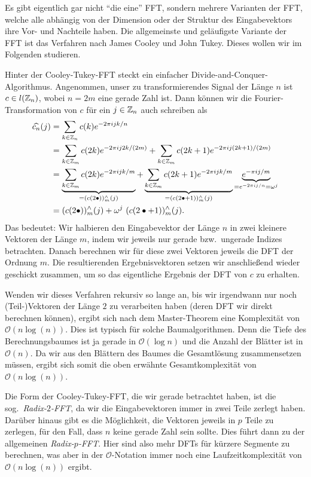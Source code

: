 Es gibt eigentlich gar nicht \enquote{die eine} FFT, sondern mehrere Varianten der FFT, welche alle 
abhängig von der Dimension oder der Struktur des Eingabevektors ihre Vor- und Nachteile haben. Die 
allgemeinste und geläufigste Variante der FFT ist das Verfahren nach James Cooley und John Tukey. 
Dieses wollen wir im Folgenden studieren.

Hinter der Cooley-Tukey-FFT steckt ein einfacher Divide-and-Conquer-Algorithmus. Angenommen, unser
zu transformierendes Signal der Länge $ n $ ist $ c \in l(\mathbb{Z}_{n}) $, wobei $ n = 2m $ eine gerade 
Zahl ist. Dann können wir die Fourier-Transformation von $ c $ für ein $ j \in \mathbb{Z}_{n} $ auch
schreiben als
\begin{align*}
    \widehat{c_{n}}(j) 
  &= \sum_{k \in \mathbb{Z}_{n}} c(k) e^{-2\pi i jk/n} \\
  &= \sum_{k \in \mathbb{Z}_{m}} c(2k) e^{-2\pi i j2k/(2m)}
       + \sum_{k \in \mathbb{Z}_{m}} c(2k+1) e^{-2\pi i j(2k+1)/(2m)} \\
  &= \underbrace{\sum_{k \in \mathbb{Z}_{m}} c(2k) e^{-2\pi i jk/m}}_{= (c(2\bullet))_{m}^{\wedge}(j)}
       + \underbrace{\sum_{k \in \mathbb{Z}_{m}} c(2k+1) e^{-2\pi i jk/m}}_{
           =(c(2\bullet + 1))_{m}^{\wedge}(j)
         }
         \underbrace{e^{-\pi i j/m}}_{= e^{-2\pi i j/n} = \omega^{j}} \\
  &= (c(2\bullet))_{m}^{\wedge}(j) + \omega^{j} \ (c(2\bullet + 1))_{m}^{\wedge}(j).
\end{align*}
Das bedeutet: Wir halbieren den Eingabevektor der Länge $ n $ in zwei kleinere Vektoren der Länge
$ m $, indem wir jeweils nur gerade bzw.\ ungerade Indizes betrachten. Danach berechnen wir für 
diese zwei Vektoren jeweils die DFT der Ordnung $ m $. Die resultierenden Ergebnisvektoren setzen 
wir anschließend wieder geschickt zusammen, um so das eigentliche Ergebnis der DFT von $ c $ zu 
erhalten.

Wenden wir dieses Verfahren rekursiv so lange an, bis wir irgendwann nur noch (Teil-)Vektoren der 
Länge $ 2 $ zu verarbeiten haben (deren DFT wir direkt berechnen können), ergibt sich nach dem
Master-Theorem eine Komplexität von $ \mathcal{O}(n \log(n)) $. Dies ist typisch für solche 
Baumalgorithmen. Denn die Tiefe des Berechnungsbaumes ist ja gerade in $ \mathcal{O}(\log n) $ und
die Anzahl der Blätter ist in $ \mathcal{O}(n) $. Da wir aus den Blättern des Baumes die 
Gesamtlösung
zusammensetzen müssen, ergibt sich somit die oben erwähnte Gesamtkomplexität von
$ \mathcal{O}(n \log(n)) $.

Die Form der Cooley-Tukey-FFT, die wir gerade betrachtet haben, ist die sog.\ \emph{Radix-$ 2 
$-FFT}, da wir die Eingabevektoren immer in zwei Teile zerlegt haben. Darüber hinaus gibt es die 
Möglichkeit, die Vektoren jeweils in $ p $ Teile zu zerlegen, für den Fall, dass $ n $ keine gerade 
Zahl sein sollte. Dies führt dann zu der allgemeinen \emph{Radix-$ p $-FFT}. Hier sind also mehr 
DFTs für kürzere Segmente zu berechnen, was aber in der $ \mathcal{O} $-Notation immer noch eine 
Laufzeitkomplexität von $ \mathcal{O}(n\log(n)) $ ergibt.


